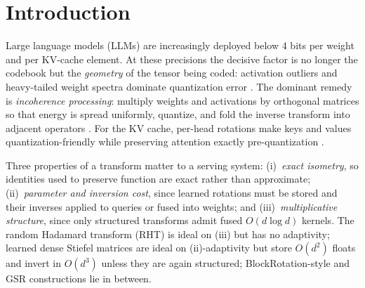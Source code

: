 \documentclass{article}
\begin{document}
\begin{abstract}
zero-external-data distribution-fidelity gates for ternary weight
quantization: all 96 attention projections ($402.65$M parameters,
$2.18$ bits per weight) give
$\mathrm{KL}(P_{\mathrm{fp16}}\|P_{\mathrm{quant}})=0.276$
nats/token and $70.2\%$ top-1 agreement against the fp16 teacher on
$65{,}536$ teacher-generated tokens, and a single polish pass over the
quantization parameters alone (no external data) nearly halves the
divergence to $0.134$ nats/token at $79.9\%$ top-1, with
Hessian-allocated mixed-rank correction edging uniform rank at matched
budget ($0.1337$ vs.\ $0.1374$). Model-level perplexity and downstream
benchmarks remain future work, with the evaluation protocol specified
in Appendix~\ref{app:acc}. We additionally release Metal and Triton
kernel \emph{specifications}, which have not yet been benchmarked on silicon.
\end{abstract}

\section{Introduction}
\label{sec:intro}

Large language models (LLMs) are increasingly deployed below 4 bits per weight
and per KV-cache element. At these precisions the decisive factor is no longer
the codebook but the \emph{geometry} of the tensor being coded: activation
outliers and heavy-tailed weight spectra dominate quantization error
\citep{dettmers2022llmint8,sun2024massive,frantar2023gptq}. The dominant remedy
is \emph{incoherence processing}: multiply weights and activations by orthogonal
matrices so that energy is spread uniformly, quantize, and fold the inverse
transform into adjacent operators \citep{chee2023quip,ashkboos2024quarot,liu2024spinquant,tseng2024quipsharp,tseng2024qtip,lin2024duquant}.
For the KV cache, per-head rotations make keys and values quantization-friendly
while preserving attention exactly pre-quantization
\citep{liu2024kivi,hooper2024kvquant,su2025rotatekv,lin2024qserve}.

Three properties of a transform matter to a serving system: (i)~\emph{exact
isometry}, so identities used to preserve function are exact rather than
approximate; (ii)~\emph{parameter and inversion cost}, since learned rotations
must be stored and their inverses applied to queries or fused into weights; and
(iii)~\emph{multiplicative structure}, since only structured transforms admit
fused $O(d\log d)$ kernels. The random Hadamard transform (RHT) is ideal on
(iii) but has no adaptivity; learned dense Stiefel matrices are ideal on
(ii)-adaptivity but store $O(d^2)$ floats and invert in $O(d^3)$ unless they are
again structured; BlockRotation-style and GSR constructions
\citep{choi2025gsr} lie in between.
\end{document}
